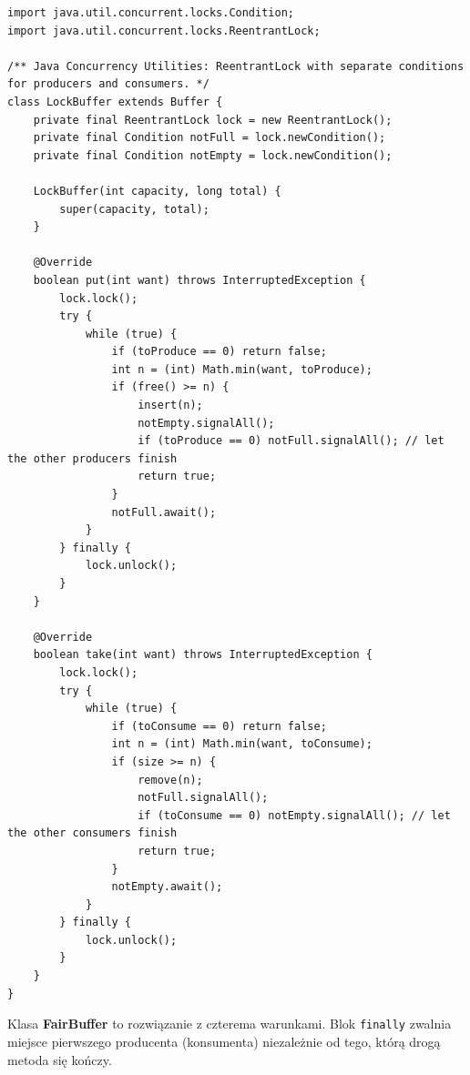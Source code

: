 \documentclass[11pt,a4paper]{article}
\begin{document}
\begin{lstlisting}[caption={Klasa \textbf{LockBuffer} (\texttt{src/LockBuffer.java})}]
import java.util.concurrent.locks.Condition;
import java.util.concurrent.locks.ReentrantLock;

/** Java Concurrency Utilities: ReentrantLock with separate conditions for producers and consumers. */
class LockBuffer extends Buffer {
    private final ReentrantLock lock = new ReentrantLock();
    private final Condition notFull = lock.newCondition();
    private final Condition notEmpty = lock.newCondition();

    LockBuffer(int capacity, long total) {
        super(capacity, total);
    }

    @Override
    boolean put(int want) throws InterruptedException {
        lock.lock();
        try {
            while (true) {
                if (toProduce == 0) return false;
                int n = (int) Math.min(want, toProduce);
                if (free() >= n) {
                    insert(n);
                    notEmpty.signalAll();
                    if (toProduce == 0) notFull.signalAll(); // let the other producers finish
                    return true;
                }
                notFull.await();
            }
        } finally {
            lock.unlock();
        }
    }

    @Override
    boolean take(int want) throws InterruptedException {
        lock.lock();
        try {
            while (true) {
                if (toConsume == 0) return false;
                int n = (int) Math.min(want, toConsume);
                if (size >= n) {
                    remove(n);
                    notFull.signalAll();
                    if (toConsume == 0) notEmpty.signalAll(); // let the other consumers finish
                    return true;
                }
                notEmpty.await();
            }
        } finally {
            lock.unlock();
        }
    }
}
\end{lstlisting}

Klasa \textbf{FairBuffer} to rozwiązanie z czterema warunkami. Blok \texttt{finally} zwalnia miejsce pierwszego producenta (konsumenta) niezależnie od tego, którą drogą metoda się kończy.
\end{document}

